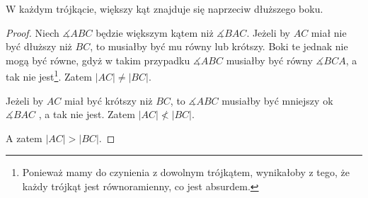 \documentclass[12pt, a4paper]{scrartcl}
\begin{document}
\begin{theorem}
    W każdym trójkącie, większy kąt znajduje się naprzeciw dłuższego boku.

    \begin{figure}[!h]
        \begin{center}
        \end{center}
    \end{figure}

    \begin{proof}
        Niech \(\measuredangle ABC\) będzie większym kątem niż \(\measuredangle
        BAC\). Jeżeli by \(AC\) miał nie być dłuższy niż \(BC\), to musiałby
        być mu równy lub krótszy. Boki te jednak nie mogą być równe, gdyż
        w takim przypadku \(\measuredangle ABC\) musiałby być równy \(
        \measuredangle BCA\), a tak nie jest\footnote{
            Ponieważ mamy do czynienia z dowolnym trójkątem, wynikałoby z tego,
            że każdy trójkąt jest równoramienny, co jest absurdem.
        }. Zatem \(|AC| \neq |BC|\).

        Jeżeli by \(AC\) miał być krótszy niż \(BC\), to \(\measuredangle ABC\)
        musiałby być mniejszy ok \(\measuredangle BAC\) , a tak nie
        jest. Zatem \(|AC| \nless |BC|\).

        A zatem \(|AC| > |BC|\).
    \end{proof}
\end{theorem}
\end{document}
